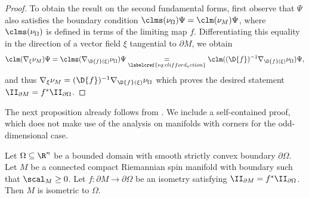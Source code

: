 \documentclass[a4paper,11pt]{amsart}
\numberwithin{equation}{section}
\begin{document}
\begin{proof}
    To obtain the result on the second fundamental forms, first observe that \(\Psi\) also satisfies the boundary condition \(\clms(\nu_\Omega) \Psi = \clm(\nu_M)\Psi\), where \(\clms(\nu_\Omega)\) is defined in terms of the limiting map \(f\).
    Differentiating this equality in the direction of a vector field \(\xi\) tangential to \(\partial M\), we obtain 
    \[
        \clm(\nabla_{\xi} \nu_M) \Psi = \clms(\nabla_{\D{f}(\xi)} \nu_\Omega) \Psi  \underset{\labelcref{eq:clifford_action}}{=} \clm((\D{f})^{-1}\nabla_{\D{f}(\xi)} \nu_\Omega) \Psi,  
    \]
    and thus \(\nabla_{\xi} \nu_M = (\D{f})^{-1}\nabla_{\D{f}(\xi)} \nu_\Omega\) which proves the desired statement \(\II_{\partial M} = f^{\ast} \II_{\partial \Omega}\).
 \end{proof}
 

The next proposition already follows from \cite[Theorem 3.2]{wang2023gromovs}.
We include a self-contained proof, which does not make use of the analysis on manifolds with corners for the odd-dimensional case.
\begin{proposition}\label{cor:flat}
    Let \(\Omega \subseteq \R^n\) be a bounded domain with smooth strictly convex boundary \(\partial \Omega\).
    Let \(M\) be a connected compact Riemannian spin manifold with boundary such that \(\scal_M \geq 0\).
    Let $f\colon\partial M\to\partial\Omega$ be an isometry satisfying \(\II_{\partial M} = f^\ast \II_{\partial \Omega}\).
    Then $M$ is isometric to $\Omega$.
\end{proposition}
\end{document}
